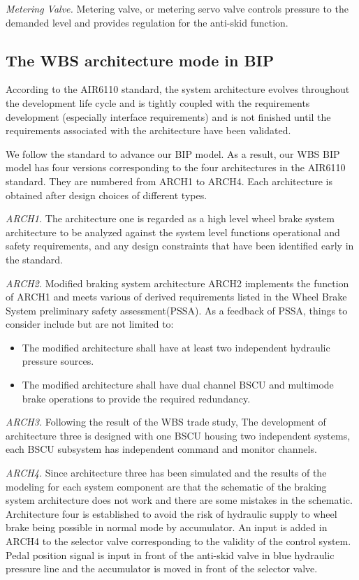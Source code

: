 \documentclass[conference]{IEEEtran}
\begin{document}
\emph{Metering Valve.} Metering valve, or metering servo valve controls pressure to the demanded level and provides regulation for the anti-skid function.

\subsection{The WBS architecture mode in BIP}
According to the AIR6110 standard, the system architecture evolves throughout the development life cycle and is tightly coupled with the requirements development (especially interface requirements) and is not finished until the requirements associated with the architecture have been validated.

We follow the standard to advance our BIP model. As a result, our WBS BIP model has four versions corresponding to the four architectures in the AIR6110 standard. They are numbered from ARCH1 to ARCH4. Each architecture is obtained after design choices of different types.

\emph{ARCH1.} The architecture one is regarded as a high level wheel brake system architecture to be analyzed against the system level functions operational and safety requirements, and any design constraints that have been identified early in the standard.

\emph{ARCH2.} Modified braking system architecture ARCH2 implements the function of ARCH1 and meets various of derived requirements listed in the Wheel Brake System preliminary safety assessment(PSSA). As a feedback of PSSA, things to consider include but are not limited to:

\begin{itemize}
\item The modified architecture shall have at least two independent hydraulic pressure sources.
\item The modified architecture shall have dual channel BSCU and multimode brake operations to provide the required redundancy.
\end{itemize}

\emph{ARCH3.} Following the result of the WBS trade study, The development of architecture three is designed with one BSCU housing two independent systems, each BSCU subsystem has independent command and monitor channels.

\emph{ARCH4.} Since architecture three has been simulated and the results of the modeling for each system component are that the schematic of the braking system architecture does not work and there are some mistakes in the schematic. Architecture four is established to avoid the risk of hydraulic supply to wheel brake being possible in normal mode by accumulator. An input is added in ARCH4 to the selector valve corresponding to the validity of the control system. Pedal position signal is input in front of the anti-skid valve in blue hydraulic pressure line and the accumulator is moved in front of the selector valve.
\end{document}
